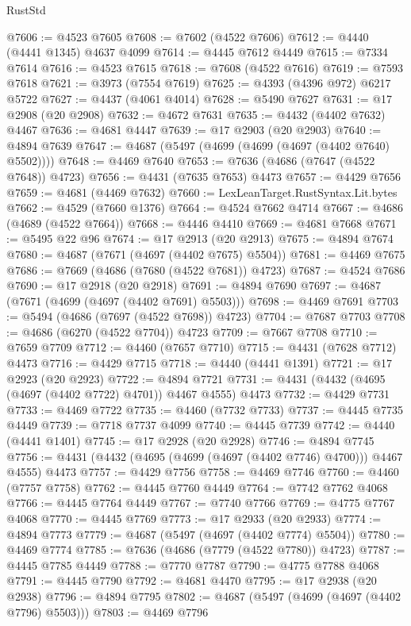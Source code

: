 \begin{lexlean}{RustStd}
\begin{coremodule}
@7606 := @4523 @7605
@7608 := @7602 (@4522 @7606)
@7612 := @4440 (@4441 @1345) @4637 @4099
@7614 := @4445 @7612 @4449
@7615 := @7334 @7614
@7616 := @4523 @7615
@7618 := @7608 (@4522 @7616)
@7619 := @7593 @7618
@7621 := @3973 (@7554 @7619)
@7625 := @4393 (@4396 @972) @6217 @5722
@7627 := @4437 (@4061 @4014)
@7628 := @5490 @7627
@7631 := @17 @2908 (@20 @2908)
@7632 := @4672 @7631
@7635 := @4432 (@4402 @7632) @4467
@7636 := @4681 @4447
@7639 := @17 @2903 (@20 @2903)
@7640 := @4894 @7639
@7647 := @4687 (@5497 (@4699 (@4699 (@4697 (@4402 @7640) @5502))))
@7648 := @4469 @7640
@7653 := @7636 (@4686 (@7647 (@4522 @7648)) @4723)
@7656 := @4431 (@7635 @7653) @4473
@7657 := @4429 @7656
@7659 := @4681 (@4469 @7632)
@7660 := LexLeanTarget.RustSyntax.Lit.bytes
@7662 := @4529 (@7660 @1376)
@7664 := @4524 @7662 @4714
@7667 := @4686 (@4689 (@4522 @7664))
@7668 := @4446 @4410
@7669 := @4681 @7668
@7671 := @5495 @22 @96
@7674 := @17 @2913 (@20 @2913)
@7675 := @4894 @7674
@7680 := @4687 (@7671 (@4697 (@4402 @7675) @5504))
@7681 := @4469 @7675
@7686 := @7669 (@4686 (@7680 (@4522 @7681)) @4723)
@7687 := @4524 @7686
@7690 := @17 @2918 (@20 @2918)
@7691 := @4894 @7690
@7697 := @4687 (@7671 (@4699 (@4697 (@4402 @7691) @5503)))
@7698 := @4469 @7691
@7703 := @5494 (@4686 (@7697 (@4522 @7698)) @4723)
@7704 := @7687 @7703
@7708 := @4686 (@6270 (@4522 @7704)) @4723
@7709 := @7667 @7708
@7710 := @7659 @7709
@7712 := @4460 (@7657 @7710)
@7715 := @4431 (@7628 @7712) @4473
@7716 := @4429 @7715
@7718 := @4440 (@4441 @1391)
@7721 := @17 @2923 (@20 @2923)
@7722 := @4894 @7721
@7731 := @4431 (@4432 (@4695 (@4697 (@4402 @7722) @4701)) @4467 @4555) @4473
@7732 := @4429 @7731
@7733 := @4469 @7722
@7735 := @4460 (@7732 @7733)
@7737 := @4445 @7735 @4449
@7739 := @7718 @7737 @4099
@7740 := @4445 @7739
@7742 := @4440 (@4441 @1401)
@7745 := @17 @2928 (@20 @2928)
@7746 := @4894 @7745
@7756 := @4431 (@4432 (@4695 (@4699 (@4697 (@4402 @7746) @4700))) @4467 @4555) @4473
@7757 := @4429 @7756
@7758 := @4469 @7746
@7760 := @4460 (@7757 @7758)
@7762 := @4445 @7760 @4449
@7764 := @7742 @7762 @4068
@7766 := @4445 @7764 @4449
@7767 := @7740 @7766
@7769 := @4775 @7767 @4068
@7770 := @4445 @7769
@7773 := @17 @2933 (@20 @2933)
@7774 := @4894 @7773
@7779 := @4687 (@5497 (@4697 (@4402 @7774) @5504))
@7780 := @4469 @7774
@7785 := @7636 (@4686 (@7779 (@4522 @7780)) @4723)
@7787 := @4445 @7785 @4449
@7788 := @7770 @7787
@7790 := @4775 @7788 @4068
@7791 := @4445 @7790
@7792 := @4681 @4470
@7795 := @17 @2938 (@20 @2938)
@7796 := @4894 @7795
@7802 := @4687 (@5497 (@4699 (@4697 (@4402 @7796) @5503)))
@7803 := @4469 @7796

\end{coremodule}
\end{lexlean}
